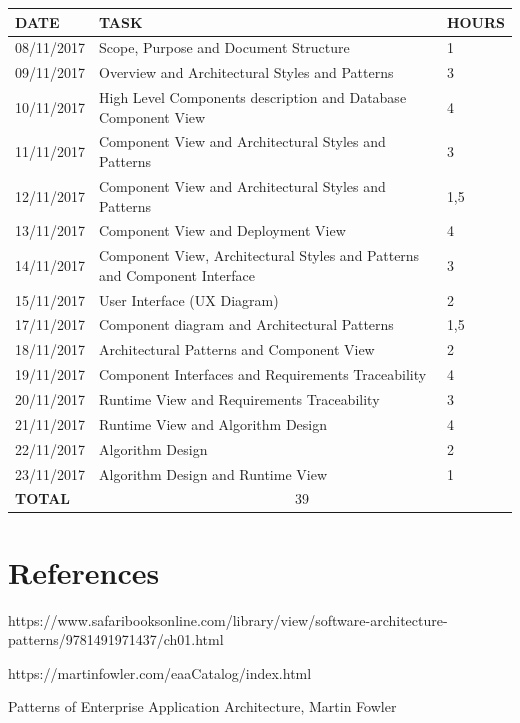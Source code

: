 \documentclass[12pt]{article}
\begin{document}
\begin{center}
\begin{tabular}{ |p{}|p{}|p{}| } 
 \hline
 \textbf{DATE} & \textbf{TASK} & \textbf{HOURS} \\ 
  \hline
 08/11/2017 &  Scope, Purpose and Document Structure & 1 \\ 
  \hline
 09/11/2017 & Overview and Architectural Styles and Patterns & 3 \\
  \hline
  10/11/2017 & High Level Components description and Database Component View & 4 \\ 
  \hline
  11/11/2017 & Component View and Architectural Styles and Patterns & 3 \\ 
  \hline
  12/11/2017 & Component View and Architectural Styles and Patterns & 1,5 \\ 
  \hline
  13/11/2017 & Component View and Deployment View & 4 \\ 
  \hline
  14/11/2017 & Component View, Architectural Styles and Patterns and Component Interface & 3 \\ 
  \hline
  15/11/2017 & User Interface (UX Diagram) & 2 \\ 
  \hline
  17/11/2017 & Component diagram and Architectural Patterns & 1,5 \\
  \hline
  18/11/2017 & Architectural Patterns and Component View & 2 \\
  \hline
  19/11/2017 & Component Interfaces and Requirements Traceability & 4 \\
  \hline
  20/11/2017 & Runtime View and Requirements Traceability & 3 \\
  \hline
  21/11/2017 & Runtime View and Algorithm Design & 4 \\
  \hline
  22/11/2017 & Algorithm Design & 2 \\
  \hline
  23/11/2017 & Algorithm Design and Runtime View & 1 \\
  \hline
  \textbf{TOTAL} & \multicolumn{2}{c|}{39} \\ 
  \hline
\end{tabular}
\end{center}

\section{References}
https://www.safaribooksonline.com/library/view/software-architecture-patterns/9781491971437/ch01.html

https://martinfowler.com/eaaCatalog/index.html

Patterns of Enterprise Application Architecture, Martin Fowler
\end{document}
